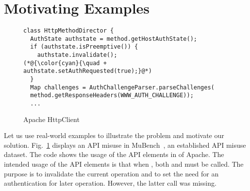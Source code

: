 \section{Motivating Examples}
\label{sec:motiv}

\begin{figure}[t]
	\centering
\begin{lstlisting}[]
class HttpMethodDirector {
  AuthState authstate = method.getHostAuthState();
  if (authstate.isPreemptive()) {
    authstate.invalidate();
(*@{\color{cyan}{\quad + authstate.setAuthRequested(true);}@*)
  }
  Map challenges = AuthChallengeParser.parseChallenges(
  method.getResponseHeaders(WWW_AUTH_CHALLENGE));
  ...
\end{lstlisting}
        \vspace{-12pt}
        \caption{Apache HttpClient}
        \vspace{-6pt}
        \label{fig:example1}
\end{figure}

Let us use real-world examples to illustrate the problem and motivate
our solution. Fig.~\ref{fig:example1} displays an API misuse in
MuBench~\cite{mudetect-msr19}, an established API misuse dataset. The
code shows the usage of the API elements in  of
Apache.  The intended usage of the API elements is that when
, both
 and
 must be called. The
purpose is to invalidate the current operation and to set the need for
an authentication for later operation. However, the latter call was
missing.

